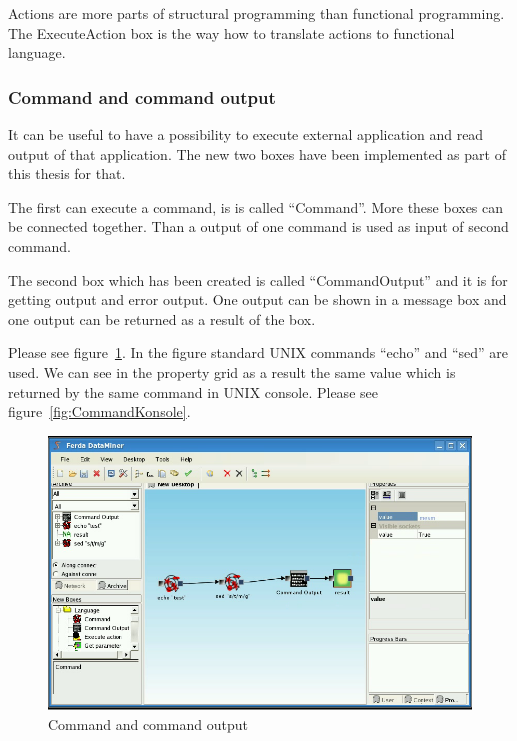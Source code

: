 \documentclass[a4paper,12pt]{book}
\begin{document}
Actions are more parts of structural programming than functional programming. The ExecuteAction box is the way how to translate actions to functional language. 

\subsubsection{Command and command output}
It can be useful to have a possibility to execute external application and read output of that application. The new two boxes have been implemented as part of this thesis for that.

The first can execute a command, is is called ``Command''. More these boxes can be connected together. Than a output of one command is used as input of second command.

The second box which has been created is called ``CommandOutput'' and it is for getting output and error output. One output can be shown in a message box and one output can be returned as a result of the box.

Please see figure~\ref{fig:boxCommand}. In the figure standard UNIX commands ``echo'' and ``sed'' are used. We can see in the property grid as a result the same value which is returned by the same command in UNIX console. Please see figure~\ref{fig:CommandKonsole}.

\begin{figure}
	\includegraphics[width=1\textwidth]{command2.png}
	\caption{Command and command output}
	\label{fig:boxCommand}
\end{figure}
\end{document}
